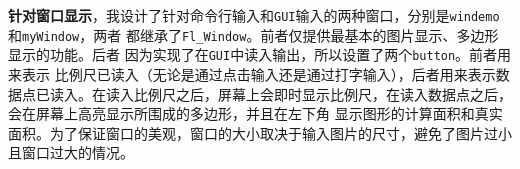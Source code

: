 \textbf{针对窗口显示}，我设计了针对命令行输入和\texttt{GUI}输入的两种窗口，分别是\texttt{windemo}和\texttt{myWindow}，两者
都继承了\texttt{Fl_Window}。前者仅提供最基本的图片显示、多边形显示的功能。后者
因为实现了在\texttt{GUI}中读入输出，所以设置了两个\texttt{button}。前者用来表示
比例尺已读入（无论是通过点击输入还是通过打字输入），后者用来表示数据点已读入。在读入比例尺之后，屏幕上会即时显示比例尺，在读入数据点之后，会在屏幕上高亮显示所围成的多边形，并且在左下角
显示图形的计算面积和真实面积。为了保证窗口的美观，窗口的大小取决于输入图片的尺寸，避免了图片过小且窗口过大的情况。